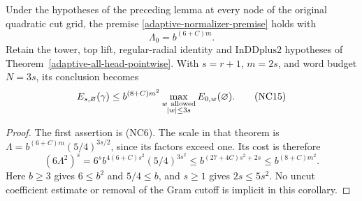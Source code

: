 \begin{corollary}
\label{cor:adaptive-explicit-normalizer}
Under the hypotheses of the preceding lemma at every node of
the original quadratic cut grid, the premise
\eqref{adaptive-normalizer-premise} holds with
\[
                    \Lambda_0=b^{(6+C)m}.
\]
Retain the tower, top lift, regular-radial identity and
\(\mathrm{InDDplus2}\) hypotheses of
Theorem~\ref{adaptive-all-head-pointwise}. With \(s=r+1\),
\(m=2s\), and word budget \(N=3s\), its conclusion becomes
\[
 E_{s,\varnothing}(\gamma)
      \le b^{(8+C)m^2}
           \max_{\substack{w\ {\rm allowed}\\|w|\le3s}}
                           E_{0,w}(\varnothing).
                                                        \tag{NC15}
\]
\end{corollary}
\begin{proof}
The first assertion is (NC6). The scale in that theorem is
\(\Lambda=b^{(6+C)m}(5/4)^{3s/2}\), since its factors exceed one.
Its cost is therefore
\[
 (6\Lambda^2)^s
    =6^s b^{4(6+C)s^2}(5/4)^{3s^2}
    \le b^{(27+4C)s^2+2s}
    \le b^{(8+C)m^2}.
\]
Here \(b\ge3\) gives \(6\le b^2\) and \(5/4\le b\), and
\(s\ge1\) gives \(2s\le5s^2\). No uncut coefficient estimate
or removal of the Gram cutoff is implicit in this corollary.
\end{proof}
